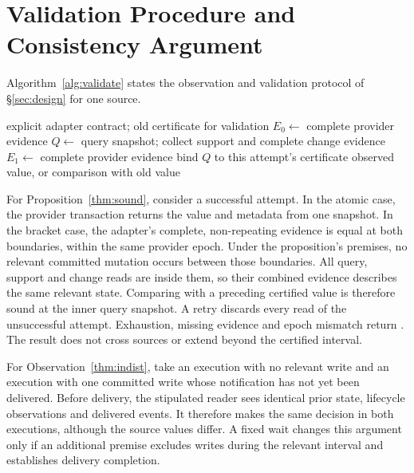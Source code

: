 \section{Validation Procedure and Consistency Argument}
\label{app:proofs}
Algorithm~\ref{alg:validate} states the observation and validation protocol of \S\ref{sec:design} for one source.

\begin{algorithm}[ht]
\caption{Consistent observation or validation of one source}
\label{alg:validate}
\small
\begin{algorithmic}[1]
\Require explicit adapter contract; old certificate for validation
 \State \Return \Unknown
\EndIf
{}
 \State $E_0\gets$ complete provider evidence
 \State $Q\gets$ query snapshot; collect support and complete change evidence
 \State $E_1\gets$ complete provider evidence
  \State bind $Q$ to this attempt's certificate
  \State \Return observed value, or comparison with old value
 \EndIf
\EndFor
\State \Return \Unknown
\end{algorithmic}
\end{algorithm}

For Proposition~\ref{thm:sound}, consider a successful attempt. In the atomic case, the provider transaction returns the value and metadata from one snapshot. In the bracket case, the adapter's complete, non-repeating evidence is equal at both boundaries, within the same provider epoch. Under the proposition's premises, no relevant committed mutation occurs between those boundaries. All query, support and change reads are inside them, so their combined evidence describes the same relevant state. Comparing with a preceding certified value is therefore sound at the inner query snapshot. A retry discards every read of the unsuccessful attempt. Exhaustion, missing evidence and epoch mismatch return \Unknown. The result does not cross sources or extend beyond the certified interval.

For Observation~\ref{thm:indist}, take an execution with no relevant write and an execution with one committed write whose notification has not yet been delivered. Before delivery, the stipulated reader sees identical prior state, lifecycle observations and delivered events. It therefore makes the same decision in both executions, although the source values differ. A fixed wait changes this argument only if an additional premise excludes writes during the relevant interval and establishes delivery completion.

